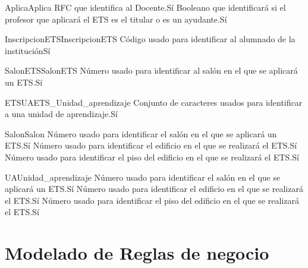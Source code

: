 \begin{cdtEntidad}{Aplica}{Aplica}
	{RFC que identifica al Docente.}{Sí}
	{Booleano que identificará si el profesor que aplicará el ETS es el titular o es un ayudante.}{Sí}
\end{cdtEntidad}
\begin{cdtEntidad}{InscripcionETS}{InscripcionETS}
	{Código usado para identificar al alumnado de la institución}{Sí}
\end{cdtEntidad}
\begin{cdtEntidad}{SalonETS}{SalonETS}
	{Número usado para identificar al salón en el que se aplicará un ETS.}{Sí}
\end{cdtEntidad}
\begin{cdtEntidad}{ETSUA}{ETS\_Unidad\_aprendizaje}
	{Conjunto de caracteres usados para identificar a una unidad de aprendizaje.}{Sí}
\end{cdtEntidad}
\begin{cdtEntidad}{Salon}{Salon}
	{Número usado para identificar el salón en el que se aplicará un ETS.}{Sí}
	{Número usado para identificar el edificio en el que se realizará el ETS.}{Sí}
	{Número usado para identificar el piso del edificio en el que se realizará el ETS.}{Sí}
	\cdtEntityRelSection
\end{cdtEntidad}
\begin{cdtEntidad}{UA}{Unidad\_aprendizaje}
	{Número usado para identificar el salón en el que se aplicará un ETS.}{Sí}
	{Número usado para identificar el edificio en el que se realizará el ETS.}{Sí}
	{Número usado para identificar el piso del edificio en el que se realizará el ETS.}{Sí}
	\cdtEntityRelSection
\end{cdtEntidad}
\section{Modelado de Reglas de negocio}



